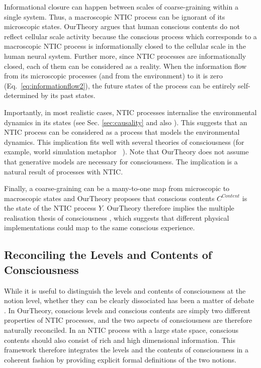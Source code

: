 \documentclass[utf8]{article}
\begin{document}
    		Informational closure can happen between scales of coarse-graining within a single system. Thus, a macroscopic NTIC process can be ignorant of its microscopic states. \ac{OurTheory} argues that human conscious contents do not reflect cellular scale activity because the conscious process which corresponds to a macroscopic NTIC process is informationally closed to the cellular scale in the human neural system. Further more, since NTIC processes are informationally closed, each of them can be considered as a reality. When the information flow from its microscopic processes (and from the environment) to it is zero (Eq.~\ref{eq:informationflow2}), the future states of the process can be entirely self-determined by its past states. 
    		
    		Importantly, in most realistic cases, NTIC processes internalise the environmental dynamics in its states (see Sec. \ref{sec:causality} and also \cite{BERTSCHINGER.2006}). This suggests that an NTIC process can be considered as a process that models the environmental dynamics. This implication fits well with several theories of consciousness (for example, world simulation metaphor ~\citep{revonsuo2006inner}). Note that \ac{OurTheory} does not assume that generative models are necessary for consciousness. The implication is a natural result of processes with NTIC. 
            
            Finally, a coarse-graining can be a many-to-one map from microscopic to macroscopic states and \ac{OurTheory} proposes that conscious contents $C^{Content}$ is the state of the NTIC process $Y$. \ac{OurTheory} therefore implies the multiple realisation thesis of consciousness \citep{putnam1967psychological,bechtel1999multiple}, which suggests that different physical implementations could map to the same conscious experience.
            
            
	    \subsection{Reconciling the Levels and Contents of Consciousness}\label{sec:reconcile}
    	    While it is useful to distinguish the levels and contents of consciousness at the notion level, whether they can be clearly dissociated has been a matter of debate \citep{bayne2016there, Fazekas2016}. In \ac{OurTheory}, conscious levels and conscious contents are simply two different properties of NTIC processes, and the two aspects of consciousness are therefore naturally reconciled. In an NTIC process with a large state space, conscious contents should also consist of rich and high dimensional information. This framework therefore integrates the levels and the contents of consciousness in a coherent fashion by providing explicit formal definitions of the two notions.  
    	    
\end{document}
